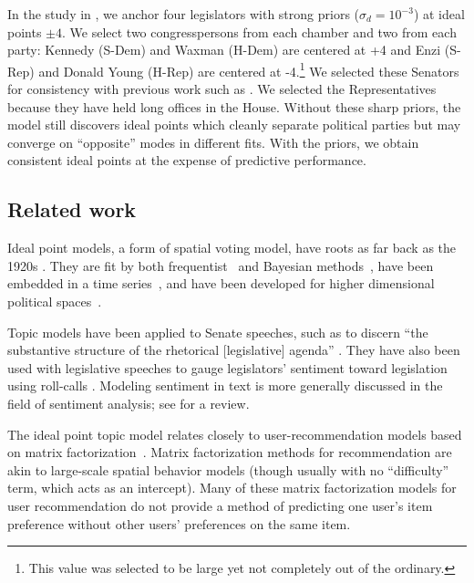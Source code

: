 In the study in , we anchor four legislators with
strong priors ($\sigma_d = 10^{-3}$) at ideal points $\pm 4$.  We
select two congresspersons from each chamber and two from each party:
Kennedy (S-Dem) and Waxman (H-Dem) are centered at +4 and Enzi (S-Rep)
and Donald Young (H-Rep) are centered at -4.\footnote{This value was
selected to be large yet not completely out of the ordinary.} We
selected these Senators for consistency with previous
work such as \cite{clinton:2004}.  We selected the Representatives because
they have held long offices in the House.  Without these sharp priors,
the model still discovers ideal points which cleanly separate
political parties but may converge on ``opposite'' modes in different
fits.  With the priors, we obtain consistent ideal points at the
expense of predictive performance.

\subsection*{Related work}


Ideal point models, a form of spatial voting model, have roots as far
back as the 1920s \citep{enelow:1984}. They are fit by both
frequentist~\citep{poole:1985,heckman:1996} and Bayesian
methods~\citep{jackman:2001,martin:2002,clinton:2004}, have been
embedded in a time series~\citep{martin:2002,wang:2010}, and have been
developed for higher dimensional political
spaces~\citep{jackman:2001,heckman:1996}.

\nocite{johnson:1999ch6}

Topic models have been applied to Senate speeches, such as to discern
``the substantive structure of the rhetorical [legislative] agenda''
\citep{quinn:2006}.  They have also been used with legislative speeches
to gauge legislators' sentiment toward legislation using roll-calls
\citep{thomas:2006}.  Modeling sentiment in text is more generally
discussed in the field of sentiment analysis; see \cite{pang:2008} for a review.


The ideal point topic model relates closely to user-recommendation
models based on matrix factorization~\citep{salakhutdinov:2008a}.
Matrix factorization methods for recommendation are akin to
large-scale spatial behavior models (though usually with no
``difficulty'' term, which acts as an intercept).  Many of these
matrix factorization models for user recommendation do not provide a
method of predicting one user's item preference without other users'
preferences on the same item.

